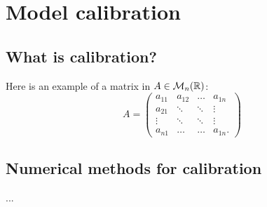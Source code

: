 \section{Model calibration}
\subsection{What is calibration?}
Here is an example of a matrix\cite{website:fermentas-lambda} in $A\in\mathcal{M}_n(\mathbb{R})$:
$$
A = 
\begin{pmatrix}
a_{11} & a_{12} & \ldots & a_{1n}\\
a_{21} & \ddots & \ddots  & \vdots\\
\vdots &  \ddots & \ddots  & \vdots\\
a_{n1} &  \ldots &  \ldots & a_{1n}.
\end{pmatrix}
$$

\subsection{Numerical methods for calibration}
...


